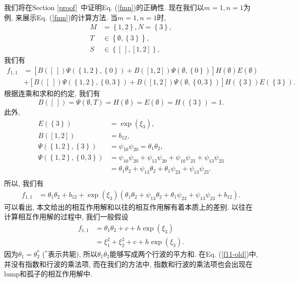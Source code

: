 \documentclass[12pt,a4paper,UTF8]{article}
\newcommand{\sbrace}[1]{\left(#1\right)}
\newcommand{\mbrace}[1]{\left[#1\right]}
\newcommand{\bbrace}[1]{\left\{#1\right\}}
\newcommand{\refeqn}[1]{Eq. (\ref{#1})}
\newcommand{\refsec}[1]{Section \ref{#1}~}
\begin{document}
我们将在\refsec{proof}中证明\refeqn{fmn}的正确性. 现在我们以$m=1,n=1$为例, 来展示\refeqn{fmn}的计算方法. 当$m=1,n=1$时, 
\begin{equation}
\begin{aligned}
M&=\bbrace{1,2},N=\bbrace{3},\\ 
T&\in\bbrace{\emptyset,\bbrace{3}}, \\ 
S&\in\bbrace{[~],[1,2]},
\end{aligned}
\end{equation}
我们有 
\begin{equation}
\begin{aligned}
f_{1,1}&=\mbrace{B([~])\Psi(\bbrace{1,2},\bbrace{0})+B([1,2])\Psi(\emptyset,\bbrace{0})}H(\emptyset)E(\emptyset) \\ 
&+\mbrace{B([~])\Psi(\bbrace{1,2},\bbrace{0,3})+B([1,2])\Psi(\emptyset,\bbrace{0,3})}H(\bbrace{3})E(\bbrace{3}).
\end{aligned}
\end{equation}
根据连乘和求和的约定, 我们有
\begin{equation}
  B([~])=\Psi(\emptyset,T)=H(\emptyset)=E(\emptyset)=H(\bbrace{3})=1. 
\end{equation}
此外, 
\begin{equation}
\begin{aligned}
E(\bbrace{3})&=\exp(\xi_3), \\ 
B([1,2])&=b_{12}, \\
\Psi(\bbrace{1,2},\bbrace{3})&=\psi_{10}\psi_{20}=\theta_1 \theta_2,\\ 
\Psi(\bbrace{1,2},\bbrace{0,3})&=\psi_{10}\psi_{20}+\psi_{13}\psi_{20}+\psi_{10}\psi_{23}+\psi_{13}\psi_{23} \\
&=\theta_1\theta_2+\psi_{13}\theta_2+\theta_1\psi_{23}+\psi_{13}\psi_{23}.\\ 
\end{aligned}
\end{equation}
所以, 我们有
\begin{equation}
\begin{aligned}
f_{1,1}&=\theta_1 \theta_2+b_{12}+\exp(\xi_3)\sbrace{\theta_1\theta_2+\psi_{13}\theta_2+\theta_1\psi_{23}+\psi_{13}\psi_{23}+b_{12}}. 
\end{aligned}
\label{f11-new}
\end{equation}
可以看出, 本文给出的相互作用解和以往的相互作用解有着本质上的差别. 以往在计算相互作用解的过程中, 我们一般假设
\begin{equation}
\begin{aligned}
f_{1,1}&=\theta_1 \theta_2+c+h \exp(\xi_3) \\ 
&=\xi_1^2+\xi_2^2+c+h \exp(\xi_3) . 
\end{aligned}
\label{f11-old}
\end{equation}
因为$\theta_1=\theta_2^*$ ($^*$表示共轭), 所以$\theta_1 \theta_2$能够写成两个行波的平方和. 在\refeqn{f11-old}中, 并没有指数和行波的乘法项, 而在我们的方法中, 指数和行波的乘法项也会出现在lump和孤子的相互作用解中. 
\end{document}
